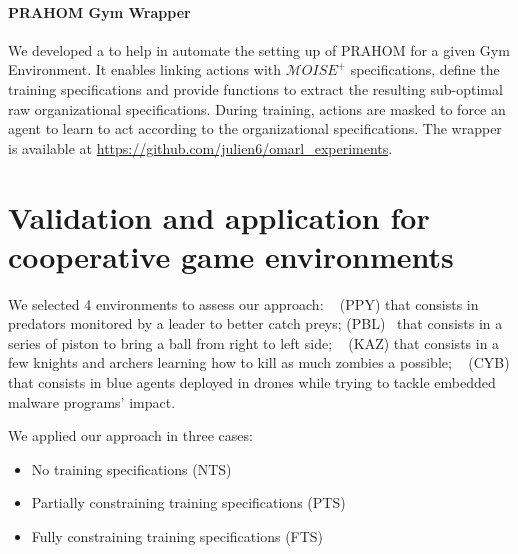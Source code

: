 \documentclass[runningheads]{llncs}
\begin{document}
\paragraph{\textbf{PRAHOM Gym Wrapper}\label{gym-wrapper}} We developed a  to help in automate the setting up of PRAHOM for a given Gym Environment. It enables linking actions with $\mathcal{M}OISE^+$ specifications, define the training specifications and provide functions to extract the resulting sub-optimal raw organizational specifications. During training, actions are masked to force an agent to learn to act according to the organizational specifications. The wrapper is available at \url{https://github.com/julien6/omarl_experiments}.

\section{Validation and application for cooperative game environments}


We selected 4 environments to assess our approach: ~\cite{Lowe2017} (PPY) that consists in predators monitored by a leader to better catch preys;  (PBL)~\cite{Terry2021} that consists in a series of piston to bring a ball from right to left side; ~\cite{Terry2021} (KAZ) that consists in a few knights and archers learning how to kill as much zombies a possible; ~\cite{cage_challenge_3_announcement} (CYB) that consists in blue agents deployed in drones while trying to tackle embedded malware programs' impact.

We applied our approach in three cases:
\begin{itemize}
    \item No training specifications (NTS)
    \item Partially constraining training specifications (PTS)
    \item Fully constraining training specifications (FTS)
\end{itemize}
\end{document}
